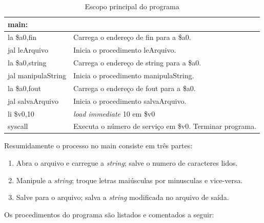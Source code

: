 \documentclass[12pt,a4paper]{article}
\numberwithin{figure}{subsection}
\numberwithin{table}{subsection}
\begin{document}
\begin{table}[H]
	\renewcommand{\arraystretch}{1.2}
	\centering
	\caption*{Escopo principal do programa}
	\label{q2cod:main}
	\begin{tabular}{>{\ttfamily}p{4cm} p{11cm}}
		\toprule
		main:              & \\
		\midrule
		la \$a0,fin	       & Carrega o endereço de {\ttfamily fin} para a {\ttfamily \$a0}. \\
		jal leArquivo      & Inicia o procedimento {\ttfamily leArquivo}. \\
		la \$a0,string     & Carrega o endereço de {\ttfamily string} para a {\ttfamily \$a0}. \\
		jal manipulaString & Inicia o procedimento {\ttfamily manipulaString}. \\
		la \$a0,fout       & Carrega o endereço de {\ttfamily fout} para a {\ttfamily \$a0}. \\
		jal salvaArquivo   & Inicia o procedimento {\ttfamily salvaArquivo}. \\
		li \$v0,10         & \textit{load immediate} 10 em {\ttfamily \$v0} \\
		syscall            & Executa o número de serviço em {\ttfamily \$v0}. Terminar programa. \\
		\bottomrule
	\end{tabular}
\end{table}

Resumidamente o processo no {\ttfamily main} consiste em três partes:

\begin{enumerate}[leftmargin=1.3cm]
\setlength\itemsep{1pt}
	\item Abra o arquivo e carregue a \textit{string}; salve o numero de caracteres lidos.
	\item Manipule a \textit{string}; troque letras maiúsculas por minusculas e vice-versa.
	\item Salve para o arquivo; salva a \textit{string} modificada no arquivo de saída.
\end{enumerate}

Os procedimentos do programa são listados e comentados a seguir:
\end{document}
